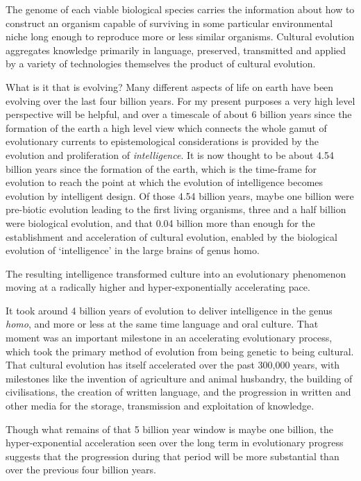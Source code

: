 The genome of each viable biological species carries the information about how to construct an organism capable of surviving in some particular environmental niche long enough to reproduce more or less similar organisms.
Cultural evolution aggregates knowledge primarily in language, preserved, transmitted and applied by a variety of technologies themselves the product of cultural evolution.

What is it that is evolving?
Many different aspects of life on earth have been evolving over the last four billion years.
For my present purposes a very high level perspective will be helpful, and over a timescale of about 6 billion years since the formation of the earth a high level view which connects the whole gamut of evolutionary currents to epistemological considerations is provided by the evolution and proliferation of \emph{intelligence}.
It is now thought to be about 4.54 billion years since the formation of the earth, which is the time-frame for evolution to reach the point at which the evolution of intelligence becomes evolution by intelligent design.
Of those 4.54 billion years, maybe one billion were pre-biotic evolution leading to the first living organisms, three and a half billion were biological evolution, and that 0.04 billion more than enough for the establishment and acceleration of cultural evolution, enabled by the biological evolution of `intelligence' in the large brains of genus homo.

The resulting intelligence transformed culture into an evolutionary phenomenon moving at a radically higher and hyper-exponentially accelerating pace.

It took around 4 billion years of evolution to deliver intelligence in the genus \emph{homo}, and more or less at the same time language and oral culture.
That moment was an important milestone in an accelerating evolutionary process, which took the primary method of evolution from being genetic to being cultural.
That cultural evolution has itself accelerated over the past 300,000 years, with milestones like the invention of agriculture and animal husbandry, the building of civilisations, the creation of written language, and the progression in written and other media for the storage, transmission and exploitation of knowledge.

Though what remains of that 5 billion year window is maybe one billion, the hyper-exponential acceleration seen over the long term in evolutionary progress suggests that the progression during that period will be more substantial than over the previous four billion years.

